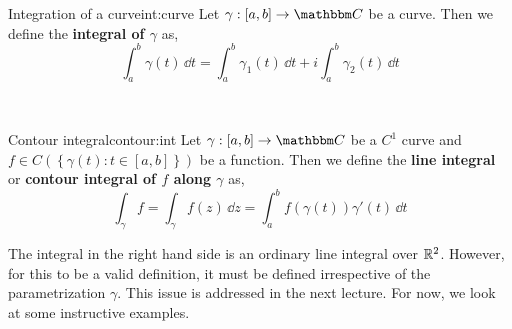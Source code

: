 \documentclass[../ComplexAnalysis_Notes.tex]{subfiles}
\begin{document}
\begin{Def}{Integration of a curve}{int:curve}
  Let \(\gamma : [a, b] \to \C\) be a curve. Then we define the \textbf{integral of \(\gamma\)} as,
  \[
    \int_a^b \gamma(t) \, \dd{t} = \int_a^b \gamma_1(t) \, \dd{t} + i \int_a^b \gamma_2(t) \, \dd{t}
  \]
\end{Def}

\

\begin{Def}{Contour integral}{contour:int}
  Let \(\gamma : [a, b] \to \C\) be a \(C^1\) curve and \(f \in C\left( \left\{ \gamma(t) : t \in [a, b] \right\} \right)\) be a function. Then we define the \textbf{line integral} or \textbf{contour integral of \(f\) along \(\gamma\)} as,
  \begin{equation}\label{contint}
    \int_\gamma f = \int_\gamma f(z) \, \dd{z} = \int_a^b f(\gamma(t)) \gamma'(t) \, \dd{t}
  \end{equation}
\end{Def}

 The integral in the right hand side is an ordinary line integral over $\mathbb{R}^2$. However, for this to be a valid definition, it must be defined irrespective of the parametrization $\gamma$. This issue is addressed in the next lecture. For now, we look at some instructive examples.


\end{document}
